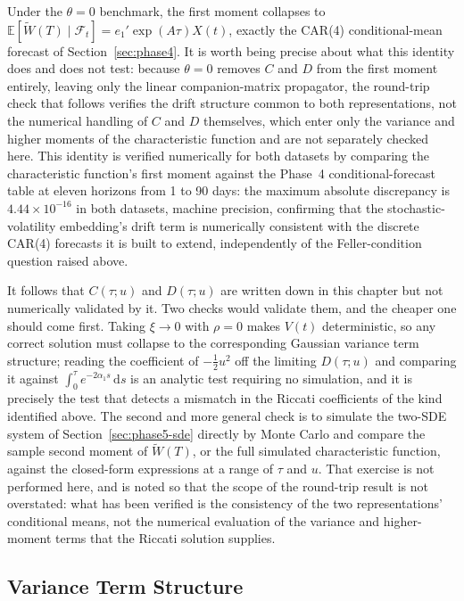 Under the $\theta=0$ benchmark, the first moment collapses to $\mathbb E[\widetilde W(T)\mid\mathcal F_t] = e_1' \exp(A\tau)X(t)$, exactly the CAR(4) conditional-mean forecast of Section~\ref{sec:phase4}. It is worth being precise about what this identity does and does not test: because $\theta = 0$ removes $C$ and $D$ from the first moment entirely, leaving only the linear companion-matrix propagator, the round-trip check that follows verifies the drift structure common to both representations, not the numerical handling of $C$ and $D$ themselves, which enter only the variance and higher moments of the characteristic function and are not separately checked here. This identity is verified numerically for both datasets by comparing the characteristic function's first moment against the Phase~4 conditional-forecast table at eleven horizons from 1 to 90 days: the maximum absolute discrepancy is $4.44\times 10^{-16}$ in both datasets, machine precision, confirming that the stochastic-volatility embedding's drift term is numerically consistent with the discrete CAR(4) forecasts it is built to extend, independently of the Feller-condition question raised above.

It follows that $C(\tau;u)$ and $D(\tau;u)$ are written down in this chapter but not numerically validated by it. Two checks would validate them, and the cheaper one should come first. Taking $\xi \to 0$ with $\rho = 0$ makes $V(t)$ deterministic, so any correct solution must collapse to the corresponding Gaussian variance term structure; reading the coefficient of $-\tfrac12 u^2$ off the limiting $D(\tau;u)$ and comparing it against $\int_0^\tau e^{-2\alpha_1 s}\,\mathrm ds$ is an analytic test requiring no simulation, and it is precisely the test that detects a mismatch in the Riccati coefficients of the kind identified above. The second and more general check is to simulate the two-SDE system of Section~\ref{sec:phase5-sde} directly by Monte Carlo and compare the sample second moment of $\widetilde W(T)$, or the full simulated characteristic function, against the closed-form expressions at a range of $\tau$ and $u$. That exercise is not performed here, and is noted so that the scope of the round-trip result is not overstated: what has been verified is the consistency of the two representations' conditional means, not the numerical evaluation of the variance and higher-moment terms that the Riccati solution supplies.

\subsection{Variance Term Structure}
\label{sec:phase5-termstructure}


